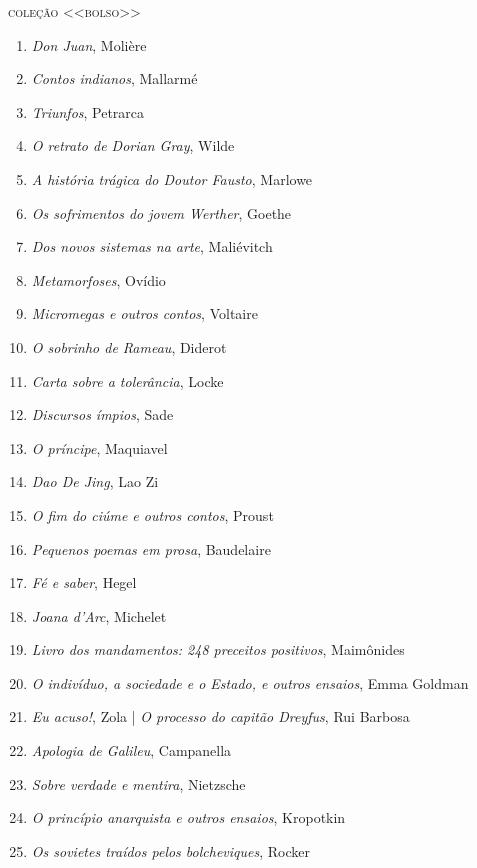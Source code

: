 \pagebreak

\pagestyle{empty}

\begingroup
\fontsize{7}{8}\selectfont

{\large\textsc{coleção <<bolso>>}}\\

\begin{enumerate}
\setlength\parskip{4.2pt}
\setlength\itemsep{-1.4mm}
\item \textit{Don Juan}, Molière
\item \textit{Contos indianos}, Mallarmé
\item \textit{Triunfos}, Petrarca
\item \textit{O retrato de Dorian Gray}, Wilde
\item \textit{A história trágica do Doutor Fausto}, Marlowe
\item \textit{Os sofrimentos do jovem Werther}, Goethe
\item \textit{Dos novos sistemas na arte}, Maliévitch
\item \textit{Metamorfoses}, Ovídio
\item \textit{Micromegas e outros contos}, Voltaire
\item \textit{O sobrinho de Rameau}, Diderot
\item \textit{Carta sobre a tolerância}, Locke
\item \textit{Discursos ímpios}, Sade
\item \textit{O príncipe}, Maquiavel
\item \textit{Dao De Jing}, Lao Zi
\item \textit{O fim do ciúme e outros contos}, Proust
\item \textit{Pequenos poemas em prosa}, Baudelaire
\item \textit{Fé e saber}, Hegel
\item \textit{Joana d'Arc}, Michelet
\item \textit{Livro dos mandamentos: 248 preceitos positivos}, Maimônides
\item \textit{O indivíduo, a sociedade e o Estado, e outros ensaios}, Emma Goldman
\item \textit{Eu acuso!}, Zola | \textit{O processo do capitão Dreyfus}, Rui Barbosa
\item \textit{Apologia de Galileu}, Campanella 
\item \textit{Sobre verdade e mentira}, Nietzsche
\item \textit{O princípio anarquista e outros ensaios}, Kropotkin
\item \textit{Os sovietes traídos pelos bolcheviques}, Rocker

\end{enumerate}
